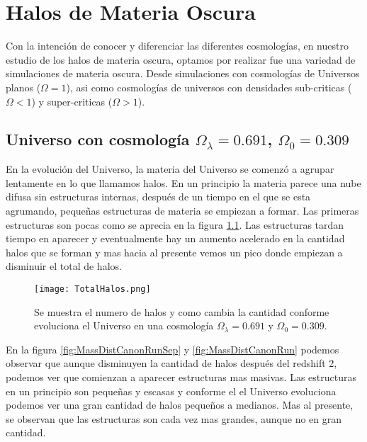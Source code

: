 
\chapter{Halos de Materia Oscura}
\setcounter{equation}{0}

Con la intención de conocer y diferenciar las diferentes cosmologías, en nuestro estudio de los halos de materia oscura, optamos por realizar fue una variedad de simulaciones de materia oscura. Desde simulaciones con cosmologías de Universos planos ($\Omega = 1$), asi como cosmologías  de universos con densidades sub-criticas ($\Omega < 1$) y super-criticas ($\Omega > 1$).

 \section{Universo con cosmología  \texorpdfstring{$\Omega_\lambda = 0.691$, $\Omega_0 = 0.309$ }{Omega lambda = 0.691, Omega 0 = 0.309}  }


En la evolución del Universo, la materia del Universo se comenzó a agrupar lentamente en lo que llamamos halos. En un principio la materia parece una nube difusa sin estructuras internas, después de un tiempo en el que se esta agrumando, pequeñas estructuras de materia se empiezan a formar. Las primeras estructuras son pocas como se aprecia en la figura \ref{fig:EvoNumTotHalos}. Las estructuras tardan tiempo en aparecer y eventualmente hay un aumento acelerado en la cantidad halos que se forman y mas hacia al presente vemos un pico donde empiezan a disminuir el total de halos.

\begin{figure}
    \centering
    \texttt{[image: TotalHalos.png]}
    \caption[Evolución del número de halos en un Universo $\Omega_\lambda = 0.691 $, $\Omega_0 = 0.309$]{\small Se muestra el numero de halos y como cambia la cantidad conforme evoluciona el Universo en una cosmología $\Omega_\lambda = 0.691 $ y $\Omega_0 = 0.309$.}
    \label{fig:EvoNumTotHalos}
\end{figure}

En la figura \ref{fig:MassDistCanonRunSep} y \ref{fig:MassDistCanonRun} podemos observar que aunque disminuyen la cantidad de halos después del redshift 2, podemos ver que comienzan a aparecer estructuras mas masivas. Las estructuras en un principio son pequeñas y escasas y conforme el el Universo evoluciona podemos ver una gran cantidad de halos pequeños a medianos. Mas al presente, se observan que las estructuras son cada vez mas grandes, aunque no en gran cantidad.

